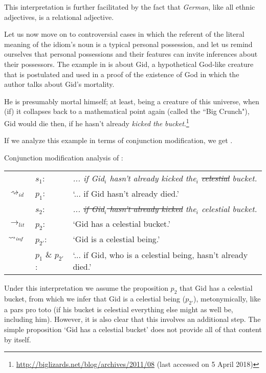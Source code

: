 \documentclass[output=paper]{langsci/langscibook}
\begin{document}
\noindent This interpretation is further facilitated by the fact that \textit{German}, like all ethnic adjectives, is a relational adjective. 

Let us now move on to controversial cases in which the referent of the literal meaning of the idiom's noun is a typical personal possession, and let us remind ourselves that personal possessions and their features can invite inferences about their possessors. The example in  is about Gid, a hypothetical God-like creature that is postulated and used in a proof of the existence of God in which the author talks about Gid's mortality.

\ea \label{celestial bucket}
He is presumably mortal himself; at least, being a creature of this universe, when (if) it collapses back to a mathematical point again (called the ``Big Crunch"), Gid would die then, if he hasn't already \textit{kicked the} \underline{} \textit{bucket}.\footnote{\url{http://biglizards.net/blog/archives/2011/08} (last accessed on 5 April 2018)}
\z

\noindent If we analyze this example in terms of conjunction modification, we get .\largerpage[-1]

\ea \label{analysis1 celestial bucket} 
Conjunction modification analysis of :\smallskip\\
\begin{tabularx}{\linewidth}[t]{@{}llQ@{}}
							& 	$s_{1}$: & \textit{... if Gid$_{i}$ hasn't already kicked the$_{i}$ \sout{celestial} bucket.} \\
$\rightsquigarrow_{id}$	    &	$p_{1}$: & `... if Gid hasn't already died.' \medskip\\
							& 	$s_{2}$: & \textit{... \sout{if Gid$_{i}$ hasn't already kicked} the$_{i}$ celestial bucket.} \\
$\rightarrow_{lit}$			&	$p_{2}$: & `Gid has a celestial bucket.' \\
$\rightsquigarrow_{\text{\itshape inf}}$	&	$p_{2'}$: & `Gid is a celestial being.' \medskip\\
							&	$p_{1}$ \& $p_{2'}$: & `... if Gid, who is a celestial being, hasn't already died.' 
\end{tabularx}
\z

\noindent Under this interpretation we assume the proposition $p_{2}$ that Gid has a celestial bucket, from which we infer that Gid is a celestial being ($p_{2'}$), metonymically, like a pars pro toto (if his bucket is celestial everything else might as well be, %
including him). However, it is also clear that this involves an additional step. The simple proposition `Gid has a celestial bucket' does not provide all of that content by itself. 
\end{document}
